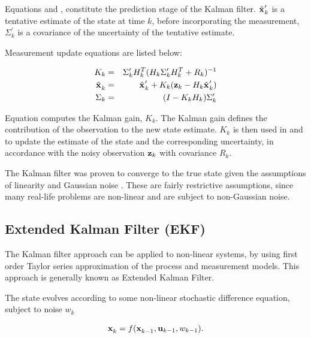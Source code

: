 Equations  and
, constitute the prediction stage of the
Kalman filter. $\hat{\x{}{}{}}_k^\prime$ is a tentative estimate of
the state at time $k$, before incorporating the measurement,
$\Sigma_k^\prime$ is a covariance of the uncertainty of the tentative
estimate.

Measurement update equations are listed below:

\begin{eqnarray}
\label{eqn:kalman_gain}
K_k &=& \Sigma_k^\prime H_k^T (H_k \Sigma_k^\prime H_k^T + R_k )^{-1}\\
\label{eqn:kalman_x_obs}
\hat{\x{}{}{}}_k &=& \hat{\x{}{}{}}_k^\prime + 
                      K_k (\z{k} - H_k \hat{\x{}{}{}}_k^\prime)\\
\label{eqn:kalman_sigma_obs}
\Sigma_k &=& (I - K_k H_k) \Sigma_k^\prime
\end{eqnarray}

Equation  computes the Kalman gain,
$K_k$. The Kalman gain defines the contribution of the observation to
the new state estimate. $K_k$ is then used in
 and  
to update the estimate of the state and the corresponding uncertainty,
in accordance with the noisy observation ${\bf z}_{k}$ with covariance
$R_k$.

The Kalman filter was proven to converge to the true state given the
assumptions of linearity and Gaussian noise \cite{kalman60}. These are
fairly restrictive assumptions, since many real-life problems
are non-linear and are subject to non-Gaussian noise.

\subsection{Extended Kalman Filter (EKF)}
\label{sec:EKF}

The Kalman filter approach can be applied to non-linear systems, by
using first order Taylor series approximation of the process and
measurement models. This approach is generally known as Extended
Kalman Filter.

The state  evolves according to some non-linear stochastic
difference equation, subject to noise $w_{k}$

\begin{equation}
   \x{k}{}{} = f (\x{k-1}{}{}, \U{k-1}, w_{k-1}).
\label{eqn:ekf_process}
\end{equation}

